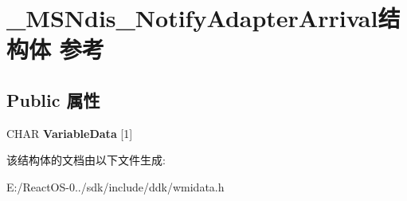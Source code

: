 \hypertarget{struct___m_s_ndis___notify_adapter_arrival}{}\section{\+\_\+\+M\+S\+Ndis\+\_\+\+Notify\+Adapter\+Arrival结构体 参考}
\label{struct___m_s_ndis___notify_adapter_arrival}
\subsection*{Public 属性}
\begin{DoxyCompactItemize}
\item 
\mbox{\label{struct___m_s_ndis___notify_adapter_arrival_ab960b8ba4e543d6edca2bba029a5e59a}} 
C\+H\+AR {\bfseries Variable\+Data} \mbox{[}1\mbox{]}
\end{DoxyCompactItemize}


该结构体的文档由以下文件生成\+:\begin{DoxyCompactItemize}
\item 
E\+:/\+React\+O\+S-\/0../sdk/include/ddk/wmidata.\+h\end{DoxyCompactItemize}
